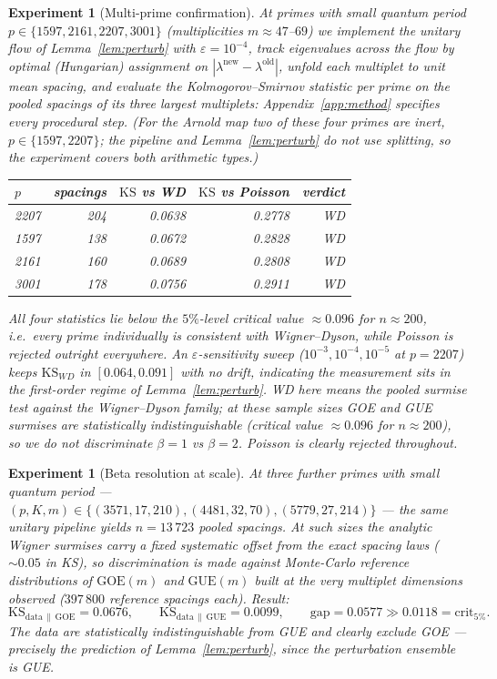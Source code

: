 \documentclass[11pt]{article}
\newtheorem{experiment}[theorem]{Experiment}
\begin{document}
\begin{experiment}[Multi-prime confirmation]\label{exp:multi}
At primes with small quantum period
$p\in\{1597,2161,2207,3001\}$ (multiplicities $m\approx47$--$69$) we
implement the unitary flow of Lemma~\ref{lem:perturb} with
$\varepsilon=10^{-4}$, track eigenvalues across the flow by optimal
(Hungarian) assignment on $|\lambda^{\text{new}}-\lambda^{\text{old}}|$,
unfold each multiplet to unit mean spacing, and evaluate the
Kolmogorov--Smirnov statistic \emph{per prime} on the pooled spacings
of its three largest multiplets:
Appendix~\ref{app:method} specifies every procedural step.
(For the Arnold map two of these four primes are inert,
$p\in\{1597,2207\}$; the pipeline and Lemma~\ref{lem:perturb} do not
use splitting, so the experiment covers both arithmetic types.)
\begin{center}
\begin{tabular}{lrrrr}
\toprule
$p$ & spacings & $\mathrm{KS}$ vs WD & $\mathrm{KS}$ vs Poisson & verdict\\
\midrule
2207 & 204 & 0.0638 & 0.2778 & WD \\
1597 & 138 & 0.0672 & 0.2828 & WD \\
2161 & 160 & 0.0689 & 0.2808 & WD \\
3001 & 178 & 0.0756 & 0.2911 & WD \\
\bottomrule
\end{tabular}
\end{center}
All four statistics lie below the $5\%$-level critical value
${\approx}0.096$ for $n\approx200$, i.e.\ every prime individually is
consistent with Wigner--Dyson, while Poisson is rejected outright
everywhere. An $\varepsilon$-sensitivity sweep
($10^{-3},10^{-4},10^{-5}$ at $p=2207$) keeps $\mathrm{KS}_{WD}$ in
$[0.064,0.091]$ with no drift, indicating the measurement sits in the
first-order regime of Lemma~\ref{lem:perturb}.
WD here means the pooled surmise test against the Wigner--Dyson family;
at these sample sizes GOE and GUE surmises are statistically
indistinguishable (critical value ${\approx}0.096$ for $n\approx200$),
so we do not discriminate $\beta=1$ vs $\beta=2$. Poisson is clearly
rejected throughout.
\end{experiment}

\begin{experiment}[Beta resolution at scale]\label{exp:beta}
At three further primes with small quantum period ---
$(p,K,m)\in\{(3571,17,210),(4481,32,70),(5779,27,214)\}$ --- the same
unitary pipeline yields $n=13\,723$ pooled spacings. At such sizes the
analytic Wigner \emph{surmises} carry a fixed systematic offset from
the exact spacing laws (${\sim}0.05$ in KS), so discrimination is made
against Monte-Carlo reference distributions of $\mathrm{GOE}(m)$ and
$\mathrm{GUE}(m)$ built at the very multiplet dimensions observed
($397\,800$ reference spacings each). Result:
\[
\mathrm{KS}_{\mathrm{data}\,\|\,\mathrm{GOE}}=0.0676,
\qquad
\mathrm{KS}_{\mathrm{data}\,\|\,\mathrm{GUE}}=0.0099 ,
\qquad
\text{gap}=0.0577 \gg 0.0118=\text{crit}_{5\%}.
\]
The data are statistically indistinguishable from GUE and clearly
exclude GOE --- precisely the prediction of Lemma~\ref{lem:perturb},
since the perturbation ensemble is GUE.
\end{experiment}
\end{document}
